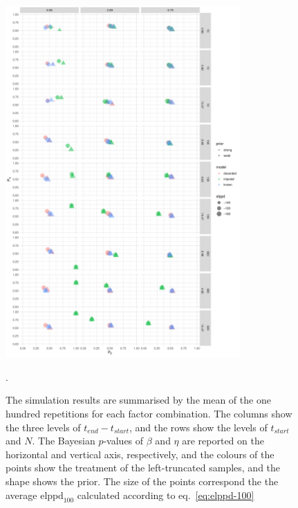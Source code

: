 \begin{figure}
    \centering
    \includegraphics[width=0.8\textwidth]{./figures/ch-2/sim-results-pvalues.pdf}
    \caption{The simulation results are summarised by the mean of the one hundred repetitions for each factor combination. The columns show the three levels of $t_{end} - t_{start}$, and the rows show the levels of $t_{start}$ and $N$. The Bayesian $p$-values of $\beta$ and $\eta$ are reported on the horizontal and vertical axis, respectively, and the colours of the points show the treatment of the left-truncated samples, and the shape shows the prior. The size of the points correspond the the average $\text{elppd}_{100}$ calculated according to eq.~\eqref{eq:elppd-100}}.
    \label{fig:sim-study-pvalue}
\end{figure}

